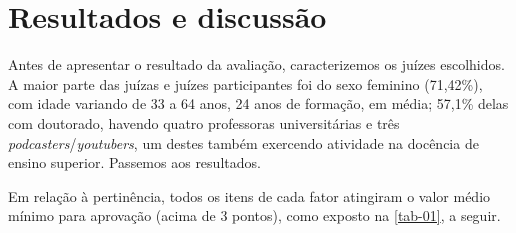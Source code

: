 \section{Resultados e discussão}\label{sec-resultados}

Antes de apresentar o resultado da avaliação, caracterizemos os juízes
escolhidos. A maior parte das juízas e juízes participantes foi do sexo
feminino (71,42\%), com idade variando de 33 a 64 anos, 24 anos de formação, em
média; 57,1\% delas com doutorado, havendo quatro professoras universitárias e
três \textit{podcasters}/\textit{youtubers}, um destes também exercendo
atividade na docência de ensino superior. Passemos aos resultados.

Em relação à pertinência, todos os itens de cada fator atingiram o valor médio
mínimo para aprovação (acima de 3 pontos), como exposto na \cref{tab-01}, a
seguir.

